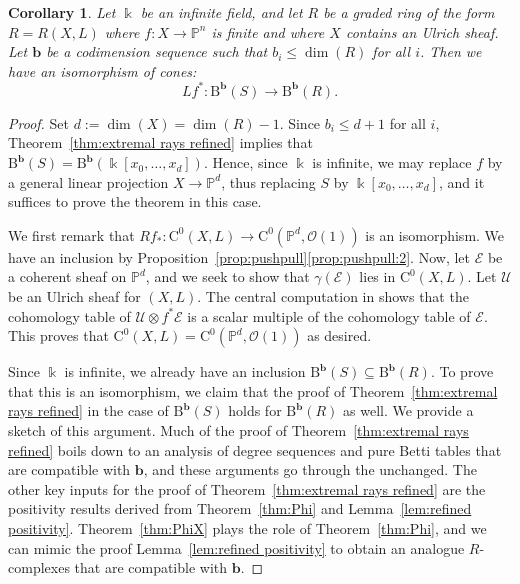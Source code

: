 \documentclass[12pt]{amsart}
\newtheorem{cor}[lemma]{Corollary}
\theoremstyle{definition}
\theoremstyle{remark}
\newcommand{\kk}{\Bbbk}
\newcommand{\PP}{\mathbb{P}}
\newcommand{\bb}{\mathbf{b}}
\newcommand{\cO}{\mathcal{O}}
\newcommand{\cE}{\mathcal{E}}
\newcommand{\cU}{\mathcal{U}}
\newcommand{\CQ}{\mathrm{C}}
\newcommand{\BBQ}{\mathrm{B}}
\begin{document}
\begin{cor}\label{cor:new graded rings}
Let $\kk$ be an infinite field, and let $R$ be a graded ring of the form $R=R(X,L)$ where $f\colon X\to \PP^n$ is finite and where $X$ contains an Ulrich sheaf.   Let $\bb$ be a codimension sequence such that $b_i\leq \dim(R)$ for all $i$.  Then we have  an isomorphism of cones:
\[
Lf^*\colon \BBQ^{\bb}(S)\to \BBQ^{\bb}(R).
\]
\end{cor}
\begin{proof}

Set $d:=\dim(X)=\dim(R)-1$.  Since $b_i\leq d+1$ for all $i$, Theorem~\ref{thm:extremal rays refined} implies that $\BBQ^{\bb}(S)=\BBQ^{\bb}(\kk[x_0,\dots,x_d]).$  Hence,  since $\kk$ is infinite, we may replace $f$ by a general linear projection $X\to \PP^d$, thus replacing $S$ by $\kk[x_0,\dots,x_d]$, and it suffices to prove the theorem in this case.

We first remark that $Rf_*\colon \CQ^0(X,L)\to \CQ^{0}(\PP^d, \cO(1))$  is an isomorphism.  We have an inclusion by Proposition~\ref{prop:pushpull}\eqref{prop:pushpull:2}.  Now, let $\cE$ be a coherent sheaf on $\PP^d$, and we seek to show that $\gamma(\cE)$ lies in $\CQ^0(X,L)$.  Let $\cU$ be an Ulrich sheaf for $(X,L)$.  The central computation in \cite[Proof of Theorem 5]{eis-schrey-abel} shows that the cohomology table of $\cU\otimes f^*\cE$ is a scalar multiple of the cohomology table of $\cE$. This proves that $\CQ^0(X,L)= \CQ^{0}(\PP^d,\cO(1))$ as desired.

Since $\kk$ is infinite, we already have an inclusion $\BBQ^{\bb}(S)\subseteq \BBQ^{\bb}(R)$.  To prove that this is an isomorphism, we claim that the proof of Theorem~\ref{thm:extremal rays refined} in the case of $\BBQ^{\bb}(S)$ holds for $\BBQ^{\bb}(R)$ as well.  We provide a sketch of this argument.  Much of the proof of Theorem~\ref{thm:extremal rays refined} boils down to an analysis of degree sequences and pure Betti tables that are compatible with $\bb$, and these arguments go through the unchanged.  The other key inputs for the proof of Theorem~\ref{thm:extremal rays refined} are the positivity results derived from Theorem~\ref{thm:Phi} and Lemma~\ref{lem:refined positivity}.  Theorem~\ref{thm:PhiX} plays the role of Theorem~\ref{thm:Phi}, and we can mimic the proof Lemma~\ref{lem:refined positivity} to obtain an analogue $R$-complexes that are compatible with $\bb$.  
\end{proof}
\end{document}

